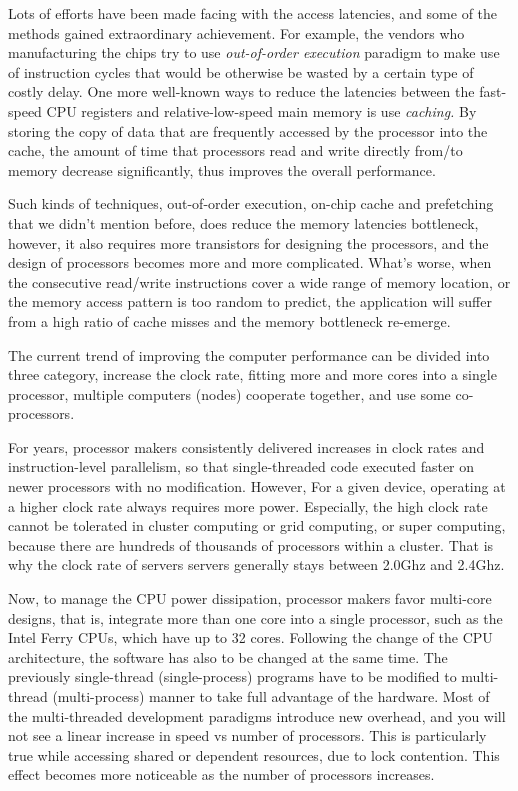 Lots of efforts have been made facing with the access latencies, and
some of the methods gained extraordinary achievement. For example,
the vendors who manufacturing the chips try to use \emph {out-of-order
execution}  paradigm to make use of instruction cycles that would
be otherwise be wasted by a certain type of costly delay. One more
well-known ways to reduce the latencies between the fast-speed CPU
registers and relative-low-speed main memory is use \emph {caching.}
By storing the copy of data that are frequently accessed by the
processor into the cache, the amount of time that processors read
and write directly from/to memory decrease significantly, thus improves
the overall performance.

Such kinds of techniques, out-of-order execution, on-chip cache and
prefetching that we didn't mention before, does reduce the memory
latencies bottleneck, however, it also requires more transistors for
designing the processors, and the design of processors becomes more
and more complicated. What's worse, when the consecutive read/write
instructions cover a wide range of memory location, or the memory
access pattern is too random to predict, the application will suffer
from a high ratio of cache misses and the memory bottleneck re-emerge\cite{fu11}.

The current trend of improving the computer performance can be divided
into three category, increase the clock rate, fitting more and more
cores into a single processor, multiple computers (nodes) cooperate
together, and use some co-processors.

For years, processor makers consistently delivered increases in clock
rates and instruction-level parallelism, so that single-threaded code
executed faster on newer processors with no modification\cite{herb11}.
However, For a given device, operating at a higher clock rate always
requires more power. Especially, the high clock rate cannot be tolerated
in cluster computing or grid computing, or super computing, because
there are hundreds of thousands of processors within a cluster. That
is why the clock rate of servers servers generally stays between 2.0Ghz
and 2.4Ghz.

Now, to manage the CPU power dissipation, processor makers favor multi-core
designs, that is, integrate more than one core into a single processor,
such as the Intel Ferry CPUs, which have up to 32 cores. Following
the change of the CPU architecture, the software has also to be changed
at the same time. The previously single-thread (single-process) programs
have to be modified to multi-thread (multi-process) manner to take
full advantage of the hardware. Most of the multi-threaded development
paradigms introduce new overhead, and you will not see a linear increase
in speed vs number of processors. This is particularly true while
accessing shared or dependent resources, due to lock contention. This
effect becomes more noticeable as the number of processors increases\cite{moore}.

